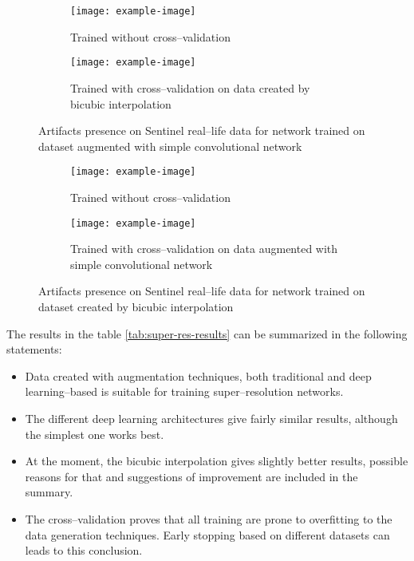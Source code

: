 \begin{figure}
    \begin{subfigure}[t]{0.45\textwidth}
        \centering
        \texttt{[image: example-image]}
        \caption{Trained without cross--validation}
    \end{subfigure}
    \hfill
    \begin{subfigure}[t]{0.45\textwidth}
        \centering
        \texttt{[image: example-image]}
        \caption{Trained with cross--validation on data created by bicubic interpolation}
    \end{subfigure}
    \caption{Artifacts presence on Sentinel real--life data for network trained on dataset augmented with simple convolutional network}
    \label{fig:sentinel-2-real-artifacts-simple-conv}
\end{figure}
\begin{figure}
    \begin{subfigure}[t]{0.45\textwidth}
        \centering
        \texttt{[image: example-image]}
        \caption{Trained without cross--validation}
    \end{subfigure}
    \hfill
    \begin{subfigure}[t]{0.45\textwidth}
        \centering
        \texttt{[image: example-image]}
        \caption{Trained with cross--validation on data augmented with simple convolutional network}
    \end{subfigure}
    \caption{Artifacts presence on Sentinel real--life data for network trained on dataset created by bicubic interpolation}
    \label{fig:sentinel-2-real-artifacts-bicubic}
\end{figure}

The results in the table \ref{tab:super-res-results} can be summarized in the following statements:
\begin{itemize}
	\item Data created with augmentation techniques, both traditional and deep learning--based is suitable for training super--resolution networks.
	\item The different deep learning architectures give fairly similar results, although the simplest one works best.
	\item At the moment, the bicubic interpolation gives slightly better results, possible reasons for that and suggestions of improvement are included in the summary.
	\item The cross--validation proves that all training are prone to overfitting to the data generation techniques. Early stopping based on different datasets can leads to this conclusion.
\end{itemize}
